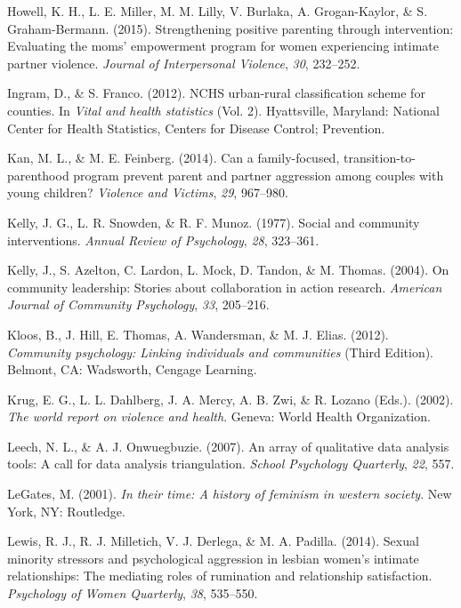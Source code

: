 \documentclass[11pt,]{tufte-book}
\begin{document}
\hypertarget{ref-howell2015strengthening}{}
Howell, K. H., L. E. Miller, M. M. Lilly, V. Burlaka, A. Grogan-Kaylor,
\& S. Graham-Bermann. (2015). Strengthening positive parenting through
intervention: Evaluating the moms' empowerment program for women
experiencing intimate partner violence. \emph{Journal of Interpersonal
Violence}, \emph{30}, 232--252.

\hypertarget{ref-ingram2012nchs}{}
Ingram, D., \& S. Franco. (2012). NCHS urban-rural classification scheme
for counties. In \emph{Vital and health statistics} (Vol. 2).
Hyattsville, Maryland: National Center for Health Statistics, Centers
for Disease Control; Prevention.

\hypertarget{ref-kan2014can}{}
Kan, M. L., \& M. E. Feinberg. (2014). Can a family-focused,
transition-to-parenthood program prevent parent and partner aggression
among couples with young children? \emph{Violence and Victims},
\emph{29}, 967--980.

\hypertarget{ref-kelly1977social}{}
Kelly, J. G., L. R. Snowden, \& R. F. Munoz. (1977). Social and
community interventions. \emph{Annual Review of Psychology}, \emph{28},
323--361.

\hypertarget{ref-kelly2004community}{}
Kelly, J., S. Azelton, C. Lardon, L. Mock, D. Tandon, \& M. Thomas.
(2004). On community leadership: Stories about collaboration in action
research. \emph{American Journal of Community Psychology}, \emph{33},
205--216.

\hypertarget{ref-kloos2012community}{}
Kloos, B., J. Hill, E. Thomas, A. Wandersman, \& M. J. Elias. (2012).
\emph{Community psychology: Linking individuals and communities} (Third
Edition). Belmont, CA: Wadsworth, Cengage Learning.

\hypertarget{ref-krug2002world}{}
Krug, E. G., L. L. Dahlberg, J. A. Mercy, A. B. Zwi, \& R. Lozano
(Eds.). (2002). \emph{The world report on violence and health}. Geneva:
World Health Organization.

\hypertarget{ref-leech2007array}{}
Leech, N. L., \& A. J. Onwuegbuzie. (2007). An array of qualitative data
analysis tools: A call for data analysis triangulation. \emph{School
Psychology Quarterly}, \emph{22}, 557.

\hypertarget{ref-legates2001their}{}
LeGates, M. (2001). \emph{In their time: A history of feminism in
western society}. New York, NY: Routledge.

\hypertarget{ref-lewis2014sexual}{}
Lewis, R. J., R. J. Milletich, V. J. Derlega, \& M. A. Padilla. (2014).
Sexual minority stressors and psychological aggression in lesbian
women's intimate relationships: The mediating roles of rumination and
relationship satisfaction. \emph{Psychology of Women Quarterly},
\emph{38}, 535--550.
\end{document}
